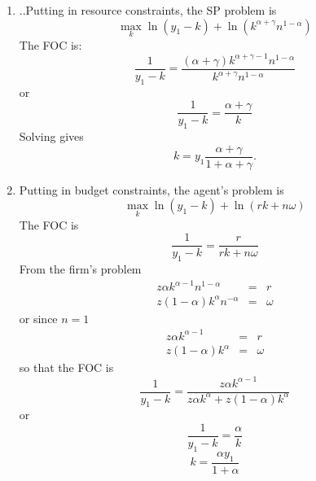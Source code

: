 \documentclass{article}
\begin{document}
\begin{enumerate}
\begin{enumerate}
\pagebreak
\end{enumerate}

\begin{enumerate}
\item ..Putting in resource constraints, the SP problem is%
\begin{equation*}
\underset{k}{\max }\ln \left( y_{1}-k\right) +\ln \left( k^{\alpha +\gamma
}n^{1-\alpha }\right)
\end{equation*}%
The FOC is: 
\begin{equation*}
\frac{1}{y_{1}-k}=\frac{\left( \alpha +\gamma \right) k^{\alpha +\gamma
-1}n^{1-\alpha }}{k^{\alpha +\gamma }n^{1-\alpha }}
\end{equation*}%
or%
\begin{equation*}
\frac{1}{y_{1}-k}=\frac{\alpha +\gamma }{k}
\end{equation*}%
$\allowbreak $Solving gives%
\begin{equation*}
k=y_{1}\frac{\alpha +\gamma }{1+\alpha +\gamma }.
\end{equation*}

\item Putting in budget constraints, the agent's problem is 
\begin{equation*}
\underset{k}{\max }\ln \left( y_{1}-k\right) +\ln \left( rk+n\omega \right)
\end{equation*}%
The FOC is 
\begin{equation*}
\frac{1}{y_{1}-k}=\frac{r}{rk+n\omega }
\end{equation*}%
From the firm's problem 
\begin{eqnarray*}
z\alpha k^{\alpha -1}n^{1-\alpha } &=&r \\
z\left( 1-\alpha \right) k^{\alpha }n^{-\alpha } &=&\omega
\end{eqnarray*}%
or since $n=1$ 
\begin{eqnarray*}
z\alpha k^{\alpha -1} &=&r \\
z\left( 1-\alpha \right) k^{\alpha } &=&\omega
\end{eqnarray*}%
so that the FOC is 
\begin{equation*}
\frac{1}{y_{1}-k}=\frac{z\alpha k^{\alpha -1}}{z\alpha k^{\alpha }+z\left(
1-\alpha \right) k^{\alpha }}
\end{equation*}%
or 
\begin{equation*}
\frac{1}{y_{1}-k}=\frac{\alpha }{k}
\end{equation*}%
\begin{equation*}
k=\frac{\alpha y_{1}}{1+\alpha }
\end{equation*}


\end{enumerate}
\end{enumerate}
\end{document}
